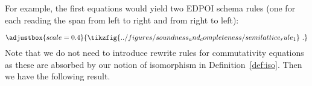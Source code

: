 For example, the first equations would yield two EDPOI schema rules (one for each reading the span from left to right and from right to left):

\[
\adjustbox{scale=0.4}{
	\tikzfig{../figures/soundness_and_completeness/semilattice_rule_1}~.
}
\]
Note that we do not need to introduce rewrite rules for commutativity equations as these are absorbed by our notion of isomorphism in Definition~\ref{def:iso}.
Then we have the following result. 


